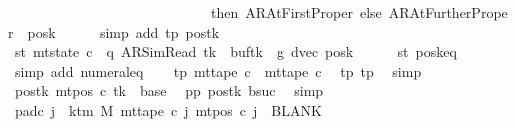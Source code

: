 \begin{isabellebody}
\ \ \ \ \ \ \ \ \ \ \ \ \ \ \ \ \ \ \ \ \ \ \ \ \ \ \ \ \ then\ AR{\isacharunderscore}{\kern0pt}AtFirstProper\ else\ AR{\isacharunderscore}{\kern0pt}AtFurtherProper{\isacharparenright}{\kern0pt}\ {\isacharequal}{\kern0pt}\ {\isacharquery}{\kern0pt}posk{\isacharprime}{\kern0pt}{\isachardoublequoteclose}\isanewline
\ \ \ \ \isamarkupfalse%
\ {\isacharparenleft}{\kern0pt}simp\ add{\isacharcolon}{\kern0pt}\ tp{}\ pos{}{\isacharunderscore}{\kern0pt}tk{\isacharparenright}{\kern0pt}\isanewline
\ \ \isamarkupfalse%
\ st{}{\isacharprime}{\kern0pt}{\isacharcolon}{\kern0pt}\ {\isachardoublequoteopen}mt{\isacharunderscore}{\kern0pt}state\ c{}\ {\isacharequal}{\kern0pt}\ {\isacharparenleft}{\kern0pt}q{\isacharcomma}{\kern0pt}\ AR{\isacharunderscore}{\kern0pt}SimRead{\isacharcomma}{\kern0pt}\ tk{\isacharcomma}{\kern0pt}\ {}{\isacharcomma}{\kern0pt}\ buf{\isacharparenleft}{\kern0pt}tk\ {\isacharcolon}{\kern0pt}{\isacharequal}{\kern0pt}\ {\isacharquery}{\kern0pt}g{}{\isacharparenright}{\kern0pt}{\isacharcomma}{\kern0pt}\ dvec{\isacharcomma}{\kern0pt}\ {\isacharquery}{\kern0pt}posk{\isacharprime}{\kern0pt}{\isacharparenright}{\kern0pt}{\isachardoublequoteclose}\isanewline
\ \ \ \ \isamarkupfalse%
\ st{}\ posk{}{\isacharunderscore}{\kern0pt}eq\ \isamarkupfalse%
\ {\isacharparenleft}{\kern0pt}simp\ add{\isacharcolon}{\kern0pt}\ numeral{\isacharunderscore}{\kern0pt}{}{\isacharunderscore}{\kern0pt}eq{\isacharunderscore}{\kern0pt}{}{\isacharparenright}{\kern0pt}\isanewline
\ \ \isamarkupfalse%
\ tp{}{\isacharprime}{\kern0pt}{\isacharcolon}{\kern0pt}\ {\isachardoublequoteopen}mt{\isacharunderscore}{\kern0pt}tape\ c{}\ {\isacharequal}{\kern0pt}\ mt{\isacharunderscore}{\kern0pt}tape\ c{\isacharprime}{\kern0pt}{\isachardoublequoteclose}\ \isamarkupfalse%
\ tp{}\ tp{}\ \isamarkupfalse%
\ simp\isanewline
\ \ \isamarkupfalse%
\ pos{}{\isacharunderscore}{\kern0pt}tk{\isacharcolon}{\kern0pt}\ {\isachardoublequoteopen}mt{\isacharunderscore}{\kern0pt}pos\ c{}\ tk\ {\isacharequal}{\kern0pt}\ base{\isachardoublequoteclose}\ \isamarkupfalse%
\ pp{}\ pos{}{\isacharunderscore}{\kern0pt}tk\ bsuc\ \isamarkupfalse%
\ simp\isanewline
\ \ \isamarkupfalse%
\ pad{\isacharunderscore}{\kern0pt}c{}{\isacharcolon}{\kern0pt}\ {\isachardoublequoteopen}{\isasymforall}j\ {\isasymge}\ k{\isacharunderscore}{\kern0pt}tm\ M{\isachardot}{\kern0pt}\ mt{\isacharunderscore}{\kern0pt}tape\ c{}\ j\ {\isacharparenleft}{\kern0pt}mt{\isacharunderscore}{\kern0pt}pos\ c{}\ j{\isacharparenright}{\kern0pt}\ {\isacharequal}{\kern0pt}\ BLANK{}{\isachardoublequoteclose}\isanewline

\end{isabellebody}
